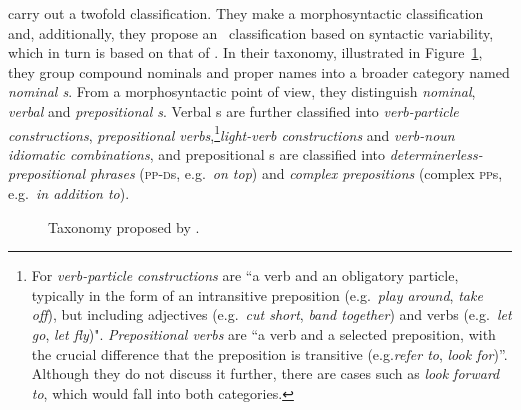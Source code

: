 \documentclass[output=paper]{langsci/langscibook}
\begin{document}
\newpage 
\citet{Baldwin2010} carry out a twofold classification. 
They make a morphosyntactic classification and, additionally, they propose an \mwe\ classification based on syntactic variability, which in turn is based on that of \citet{Sag:2002}.
In their taxonomy, illustrated in Figure~\ref{fig:Baldwin_taxonomy}, they group compound nominals and proper names into a broader category named \textit{nominal \mwe s}. 
From a morphosyntactic point of view, they distinguish \textit{nominal}, \textit{verbal} and \textit{prepositional \mwe s}. 
Verbal \mwe s are further classified into \textit{verb-particle constructions}, \textit{prepositional verbs},\footnote{For \citet{Baldwin2010} \textit{verb-particle constructions} are ``a verb and an obligatory particle, typically in the form of an intransitive preposition (e.g.\ \textit{play around}, \textit{take off}), but including adjectives (e.g.\ \textit{cut short}, \textit{band together}) and verbs (e.g.\ \textit{let go}, \textit{let fly})".
\textit{Prepositional verbs} are ``a verb and a selected preposition, with the crucial difference that the preposition is transitive (e.g.\@ \textit{refer to}, \textit{look for})''. Although they do not discuss it further, there are cases such as \textit{look forward to}, which would fall into both categories.}\textit{light-verb constructions} and \textit{verb-noun idiomatic combinations}, and prepositional \mwe s are classified into \textit{determinerless-prepositional phrases} (\textsc{pp-d}s, e.g.\ \textit{on top}) and \textit{complex prepositions} (complex \textsc{pp}s, e.g.\ \textit{in addition to}).

\begin{figure}[h]
\caption{Taxonomy proposed by \citet{Baldwin2010}.}
\label{fig:Baldwin_taxonomy}
\end{figure}
\end{document}
